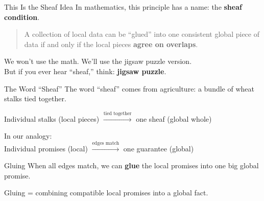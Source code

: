 \documentclass[aspectratio=169,10pt]{beamer}
\newcommand{\hint}[1]{\begin{center}
  \colorbox{hintbg}{\parbox{0.88\textwidth}{\centering\small #1}}\end{center}}
\begin{document}
\begin{frame}{This Is the Sheaf Idea}
In mathematics, this principle has a name: the \textbf{sheaf condition}.
\vspace{0.5em}
\begin{quote}
A collection of local data can be ``glued'' into one consistent global piece of data
if and only if the local pieces \textbf{agree on overlaps}.
\end{quote}
\vspace{0.5em}
We won't use the math. We'll use the jigsaw puzzle version.\\
But if you ever hear ``sheaf,'' think: \textbf{jigsaw puzzle}.
\end{frame}

\begin{frame}{The Word ``Sheaf''}
The word ``sheaf'' comes from agriculture: a bundle of wheat stalks tied together.
\vspace{0.5em}
\begin{center}
Individual stalks (local pieces) $\xrightarrow{\text{tied together}}$ one sheaf (global whole)
\end{center}
\vspace{0.5em}
In our analogy:\\
Individual promises (local) $\xrightarrow{\text{edges match}}$ one guarantee (global)
\end{frame}

\begin{frame}{Gluing}
When all edges match, we can \textbf{glue} the local promises into one big global promise.
\vspace{0.5em}
\begin{center}
\end{center}
\hint{Gluing = combining compatible local promises into a global fact.}
\end{frame}
\end{document}
